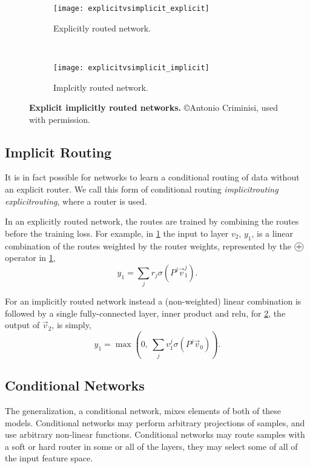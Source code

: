 \documentclass[thesis]{subfiles}
\begin{document}
	
	\begin{figure}[tbp] 
		\centering
		\begin{subfigure}[b]{0.33\textwidth}
			\centering
			\texttt{[image: explicitvsimplicit\_explicit]}
			\caption{Explicitly routed network.}\label{fig:explicitRouter}
		\end{subfigure}
		~
		\begin{subfigure}[b]{0.33\textwidth}
			\centering
			\texttt{[image: explicitvsimplicit\_implicit]}
			\caption{Implcitly routed network.}\label{fig:implicitRouter}
		\end{subfigure}
		\caption[Explicit \vs implicitly routed networks]{\textbf{Explicit \vs implicitly routed networks.} \copyright Antonio Criminisi, used with permission.}\label{fig:routerConnections}
	\end{figure}
	
	\subsection{Implicit Routing}
	It is in fact possible for networks to learn a conditional routing of data without an explicit router. We call this form of conditional routing \emph{\gls{implicitrouting}} \vs \emph{\gls{explicitrouting}}, where a router is used. 
	
	In an explicitly routed network, the routes are trained by combining the routes before the training loss. For example, in \cref{fig:explicitRouter} the input to layer $v_2$, $y_1$, is a linear combination of the routes weighted by the router weights, represented by the $\circleplus$ operator in \cref{fig:explicitRouter},
	\begin{equation}
	y_1 = \sum_j r_j \sigma\left(P^j \vec v_1^j \right).
	\end{equation}
	
	For an implicitly routed network instead a (non-weighted) linear combination is followed by a single fully-connected layer, \ie inner product and \gls{relu}, \ie for \cref{fig:implicitRouter}, the output of $\vec v_2$, is simply,
	\begin{equation}
	y_1 = \max \left(0, ~\sum_j v_1^j \sigma(P^j \vec v_0) \right).
	\end{equation}
	
	\subsection{Conditional Networks}
	The generalization, a conditional network, mixes elements of both of these models. Conditional networks may perform arbitrary projections of samples, and use arbitrary non-linear functions. Conditional networks may route samples with a soft or hard router in some or all of the layers, they may select some of all of the input feature space. 
\end{document}
